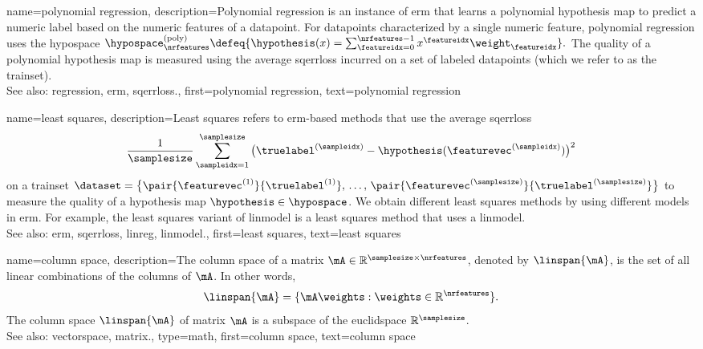 {name={polynomial regression}, 
	description={Polynomial 
		\gls{regression} is an instance of \gls{erm} that learns a polynomial \gls{hypothesis} 
		\gls{map} to predict a numeric \gls{label} based on the numeric \glspl{feature} of a \gls{datapoint}. 
		 For \glspl{datapoint} characterized by a single numeric \gls{feature}, polynomial \gls{regression} uses the \gls{hypospace} 
		$\hypospace^{(\rm poly)}_{\nrfeatures} \defeq \{ \hypothesis(x) = \sum_{\featureidx=0}^{\nrfeatures-1} x^{\featureidx} \weight_{\featureidx} \}.$
		The quality of a polynomial \gls{hypothesis} \gls{map} is measured using the average \gls{sqerrloss} 
		incurred on a set of \glspl{labeled datapoint} (which we refer to as the \gls{trainset}).
					\\
		See also: \gls{regression}, \gls{erm}, \gls{sqerrloss}.},
	first={polynomial regression},
	text={polynomial regression}
}

{name={least squares},
 description={Least squares refers to \gls{erm}-based 
               methods that use the average \gls{sqerrloss} 
			   $$ \frac{1}{\samplesize} \sum_{\sampleidx=1}^{\samplesize} \big( \truelabel^{(\sampleidx)} 
			   - \hypothesis(\featurevec^{(\sampleidx)}) \big)^{2} $$   
			   on a \gls{trainset} $\dataset = \big\{ \pair{\featurevec^{(1)}}{\truelabel^{(1)}}, \,\ldots, \,
			   \pair{\featurevec^{(\samplesize)}}{\truelabel^{(\samplesize)}} \big\}$	
			   to measure the quality of a \gls{hypothesis} \gls{map} $\hypothesis \in \hypospace$. 
			   We obtain different least squares methods by using different \glspl{model} 
			   in \gls{erm}. For example, the least squares variant of \gls{linmodel} 
			   is a least squares method that uses a \gls{linmodel}.
			   \\
		See also: \gls{erm}, \gls{sqerrloss}, \gls{linreg}, \gls{linmodel}.},
	first={least squares},
	text={least squares}
}

{name={column space},
 description={The column space of a \gls{matrix} 
                 $\mA \in \mathbb{R}^{\samplesize \times \nrfeatures}$,
			   denoted by $\linspan{\mA}$, is the set of all linear combinations of the 
			   columns of $\mA$. In other words, 
			   $$ \linspan{\mA} = \{ \mA \weights : \weights \in \mathbb{R}^{\nrfeatures} \}. $$
			   The column space $\linspan{\mA}$ of \gls{matrix} $\mA$ 
			   is a \gls{subspace} of the \gls{euclidspace} $\mathbb{R}^{\samplesize}$.
			   \\
		See also: \gls{vectorspace}, \gls{matrix}.},
	type=math,
	first={column space},
	text={column space}
}


